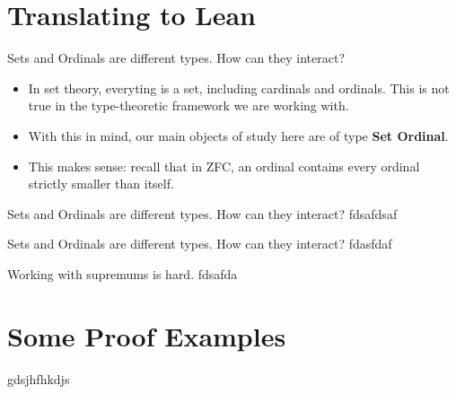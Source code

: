 \documentclass{beamer}
\theoremstyle{definition}
\begin{document}
\section{Translating to Lean}

\begin{frame}{Sets and Ordinals are different types. How can they interact?}
    \begin{itemize}
        \item In set theory, everyting is a set, including cardinals and ordinals. This is not true in the type-theoretic framework we are working with. \pause
        \item With this in mind, our main objects of study here are of type \textbf{Set Ordinal}. \pause
        \item This makes sense: recall that in ZFC, an ordinal contains every ordinal strictly smaller than itself.
    \end{itemize}
\end{frame}

\begin{frame}{Sets and Ordinals are different types. How can they interact?}
    fdsafdsaf
\end{frame}

\begin{frame}{Sets and Ordinals are different types. How can they interact?}
    fdasfdaf
\end{frame}

\begin{frame}{Working with supremums is hard.}
    fdsafda
\end{frame}

\section{Some Proof Examples}

\begin{frame}{gdsjhfhkdjs}

\end{frame}
\end{document}
